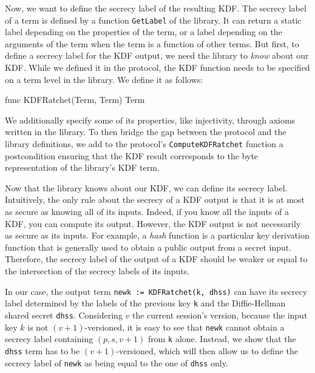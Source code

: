 Now, we want to define the secrecy label of the resulting KDF.
The secrecy label of a term is defined by a function \texttt{GetLabel} of the library. It can return a static label depending on the properties of the term, or a label depending on the arguments of the term when the term is a function of other terms. 
But first, to define a secrecy label for the KDF output, we need the library to \emph{know} about our KDF. While we defined it in the protocol, the KDF function needs to be specified on a term level in the library. We define it as follows:
\begin{gobra}
func KDFRatchet(Term, Term) Term
\end{gobra}
We additionally specify some of its properties, like injectivity, through axioms written in the library.
To then bridge the gap between the protocol and the library definitions, we add to the protocol's \texttt{ComputeKDFRatchet} function a postcondition ensuring that the KDF result corresponds to the byte representation of the library's KDF term.

Now that the library knows about our KDF, we can define its secrecy label.
Intuitively, the only rule about the secrecy of a KDF output is that it is at most as secure as knowing all of its inputs. Indeed, if you know all the inputs of a KDF, you can compute its output.
However, the KDF output is not necessarily as secure as its inputs. For example, a \emph{hash} function is a particular key derivation function that is generally used to obtain a public output from a secret input. 
Therefore, the secrecy label of the output of a KDF should be weaker or equal to the intersection of the secrecy labels of its inputs.

In our case, the output term \texttt{newk := KDFRatchet(k, dhss)} can have its secrecy label determined by the labels of the previous key \texttt{k} and the Diffie-Hellman shared secret \texttt{dhss}.
Considering $v$ the current session's version, because the input key $k$ is not $(v+1)$-versioned, it is easy to see that \texttt{newk} cannot obtain a secrecy label containing $(p,s,v+1)$ from \texttt{k} alone.
Instead, we show that the \texttt{dhss} term has to be $(v+1)$-versioned, which will then allow us to define the secrecy label of \texttt{newk} as being equal to the one of \texttt{dhss} only.

